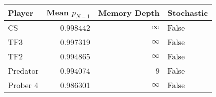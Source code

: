 \begin{tabular}{lrrl}
\toprule
   Player &  Mean $p_{N-1}$ &  Memory Depth & Stochastic \\
\midrule
       CS &        0.998442 &            \(\infty\) &      False \\
      TF3 &        0.997319 &            \(\infty\) &      False \\
      TF2 &        0.994865 &            \(\infty\) &      False \\
 Predator &        0.994074 &             9 &      False \\
 Prober 4 &        0.986301 &            \(\infty\) &      False \\
\bottomrule
\end{tabular}
